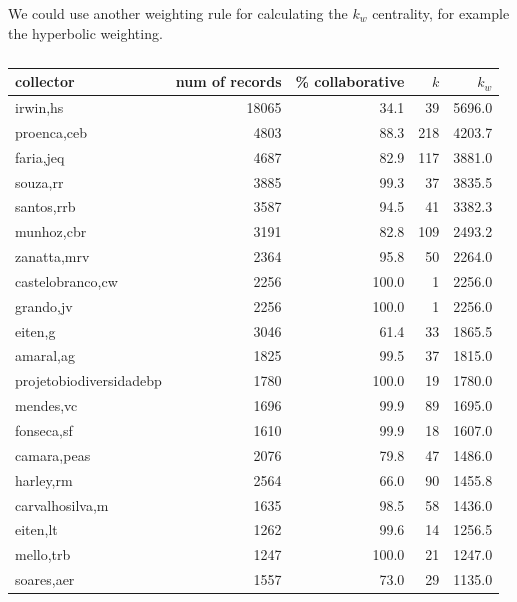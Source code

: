 We could use another weighting rule for calculating the $k_w$ centrality, for example the hyperbolic weighting.

\begin{table}[H]
  \caption{}
  \begin{center}
  \begin{tabular}{l r r r r}
      collector & num of records & \% collaborative & $k$ & $k_w$ \\
      \hline
      irwin,hs & 18065 & 34.1 & 39 & 5696.0 \\
      proenca,ceb & 4803 & 88.3 & 218 & 4203.7 \\
      faria,jeq & 4687 & 82.9 & 117 & 3881.0 \\
      souza,rr & 3885 & 99.3 & 37 & 3835.5 \\
      santos,rrb & 3587 & 94.5 & 41 & 3382.3 \\
      munhoz,cbr & 3191 & 82.8 & 109 & 2493.2 \\
      zanatta,mrv & 2364 & 95.8 & 50 & 2264.0 \\
      castelobranco,cw & 2256 & 100.0 & 1 & 2256.0 \\
      grando,jv & 2256 & 100.0 & 1 & 2256.0 \\
      eiten,g & 3046 & 61.4 & 33 & 1865.5 \\
      amaral,ag & 1825 & 99.5 & 37 & 1815.0 \\
      projetobiodiversidadebp & 1780 & 100.0 & 19 & 1780.0 \\
      mendes,vc & 1696 & 99.9 & 89 & 1695.0 \\
      fonseca,sf & 1610 & 99.9 & 18 & 1607.0 \\
      camara,peas & 2076 & 79.8 & 47 & 1486.0 \\
      harley,rm & 2564 & 66.0 & 90 & 1455.8 \\
      carvalhosilva,m & 1635 & 98.5 & 58 & 1436.0 \\
      eiten,lt & 1262 & 99.6 & 14 & 1256.5 \\
      mello,trb & 1247 & 100.0 & 21 & 1247.0 \\
      soares,aer & 1557 & 73.0 & 29 & 1135.0 \\
      \hline
  \end{tabular}
  \label{table:ub_cwn_}
  \end{center}
\end{table}

